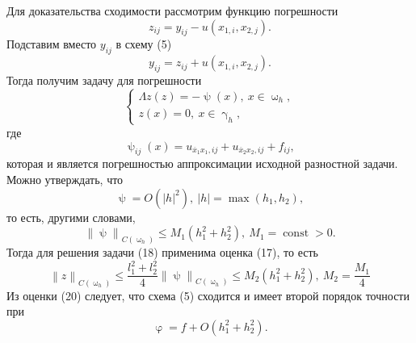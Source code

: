 \documentclass[a4paper, 12pt]{report}
\numberwithin{equation}{section}
\newcommand{\ol}{\overline}
\renewcommand{\leq}{\leqslant}
\renewcommand{\gamma}{\upgamma}
\renewcommand{\phi}{\upvarphi}
\renewcommand{\psi}{\uppsi}
\renewcommand{\omega}{\upomega}
\newcommand{\const}{\operatorname{const}}
\newcommand\Norm[1]{\left\| #1 \right\|}
\begin{document}
	Для доказательства сходимости рассмотрим функцию погрешности 
	$$z_{ij} = y_{ij} - u(x_{1,i}, x_{2,j}).$$
	Подставим вместо $y_{ij}$ в схему (5) $$y_{ij} = z_{ij} + u(x_{1,i}, x_{2,j}).$$
	Тогда получим задачу для погрешности
	\begin{equation}
		\begin{cases}
		\Lambda z(z) = - \psi(x),\ x \in \omega_h,\\
		z(x) = 0,\ x \in \gamma_h,
		\end{cases}
	\end{equation}
	где $$\psi_{ij}(x) = u_{\ol x_1 x_1, ij} + u_{\ol x_2 x_2, ij} + f_{ij},$$ которая и является погрешностью аппроксимации исходной разностной задачи. Можно утверждать, что $$\psi = O(|h|^2),\ |h| = \max(h_1, h_2),$$
	то есть, другими словами, 
	\begin{equation}
		\Norm{\psi}_{C(\omega_h)}\leq M_1(h_1^2 + h_2^2),\ M_1 = \const > 0.
	\end{equation}
	Тогда для решения задачи (18) применима оценка (17), то есть
	\begin{equation}
		\Norm{z}_{C(\omega_h)} \leq \dfrac{l_1^2 + l_2^2}{4}\Norm{\psi}_{C(\omega_h)} \leq M_2(h_1^2 +h_2^2),\ M_2 = \dfrac{M_1}{4}
	\end{equation}
	Из оценки (20) следует, что схема (5) сходится и имеет второй порядок точности при $$\phi = f + O(h_1^2 + h_2^2).$$
\end{document}
